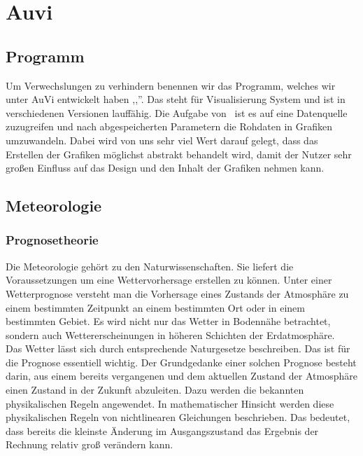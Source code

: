 \section{Auvi}

\subsection{Programm} %
Um Verwechslungen zu verhindern benennen wir das Programm, welches wir unter AuVi entwickelt haben ,,\vs ''. Das steht für Visualisierung System und ist in verschiedenen Versionen lauffähig.
Die Aufgabe von \vs\ ist es auf eine Datenquelle zuzugreifen und nach abgespeicherten Parametern die Rohdaten in Grafiken umzuwandeln.
Dabei wird von uns sehr viel Wert darauf gelegt, dass das Erstellen der Grafiken möglichst abstrakt behandelt wird, damit der Nutzer sehr großen Einfluss auf das Design und den Inhalt der Grafiken nehmen kann.

\subsection{Meteorologie} %

\subsubsection{Prognosetheorie} %
Die Meteorologie gehört zu den Naturwissenschaften.
Sie liefert die Voraussetzungen um eine Wettervorhersage erstellen zu können.
Unter einer Wetterprognose versteht man die Vorhersage eines Zustands der Atmosphäre zu einem bestimmten Zeitpunkt an einem bestimmten Ort oder in einem bestimmten Gebiet.
Es wird nicht nur das Wetter in Bodennähe betrachtet, sondern auch Wettererscheinungen in höheren Schichten der  Erdatmosphäre.
\\
Das Wetter lässt sich durch entsprechende Naturgesetze beschreiben. Das ist für die Prognose essentiell wichtig.
Der Grundgedanke einer solchen Prognose besteht darin, aus einem bereits vergangenen und dem aktuellen Zustand der Atmosphäre einen Zustand in der Zukunft abzuleiten.
Dazu werden die bekannten physikalischen Regeln angewendet.
In mathematischer Hinsicht werden diese physikalischen Regeln von nichtlinearen Gleichungen beschrieben.
Das bedeutet, dass bereits die kleinste Änderung im Ausgangszustand das Ergebnis der Rechnung relativ groß verändern kann.%

